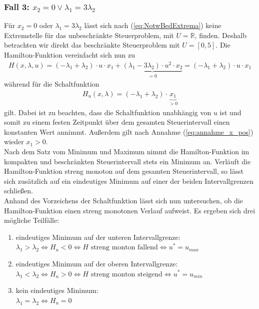\subsubsection*{Fall 3: \boldmath$x_2 = 0 \lor \lambda_1 = 3\lambda_2$}
Für $x_2 = 0$ oder $\lambda_1 = 3\lambda_2$ lässt sich nach (\ref{eq:NotwBedExtrema}) keine Extremstelle für das unbeschränkte Steuerproblem, mit $U=\mathbb{R}$, finden. Deshalb betrachten wir direkt das beschränkte Steuerproblem mit $U=[0,5]$. Die Hamilton-Funktion vereinfacht sich nun zu
\begin{align}
	H(x,\lambda, u) = (-\lambda_1 + \lambda_2) \cdot u \cdot x_1 + \underbrace{(\lambda_1 - 3\lambda_2) \cdot u^2 \cdot x_2}_{=0}
	= (-\lambda_1 + \lambda_2) \cdot u \cdot x_1
\end{align}
während für die Schaltfunktion 
\begin{align}
	H_u(x,\lambda) = (-\lambda_1 + \lambda_2) \cdot \underbrace{x_1}_{>0}
\end{align}
gilt. Dabei ist zu beachten, dass die Schaltfunktion unabhängig von $u$ ist und somit zu einem festen Zeitpunkt über dem gesamten Steuerintervall einen konstanten Wert annimmt. Außerdem gilt nach Annahme (\ref{eq:annahme_x_pos}) wieder $x_1 >0$.\\
Nach dem Satz vom Minimum und Maximum nimmt die Hamilton-Funktion im kompakten und beschränkten Steuerintervall stets ein Minimum an. Verläuft die Hamilton-Funktion streng monoton auf dem gesamten Steuerintervall, so lässt sich zusätzlich auf ein eindeutiges Minimum auf einer der beiden Intervallgrenzen schließen. \\
Anhand des Vorzeichens der Schaltfunktion lässt sich nun untersuchen, ob die Hamilton-Funktion einen streng monotonen Verlauf aufweist. Es ergeben sich drei mögliche Teilfälle:\
\begin{enumerate}[label=(\alph*)]
	\item eindeutiges Minimum auf der unteren Intervallgrenze: \\
	$\lambda_1 > \lambda_2 \Leftrightarrow H_u < 0 \Leftrightarrow H \text{ streng monton fallend} \Leftrightarrow u^* = u_{max}$  \label{item:3b}
	\item eindeutiges Minimum auf der oberen Intervallgrenze: \\
	$\lambda_1 < \lambda_2 \Leftrightarrow H_u > 0 \Leftrightarrow H \text{ streng monton steigend} \Leftrightarrow u^* = u_{min}$ \label{item:3c}
	\item kein eindeutiges Minimum: \\
	$\lambda_1 = \lambda_2 \Leftrightarrow H_u = 0$ \label{item:3a}
\end{enumerate}
